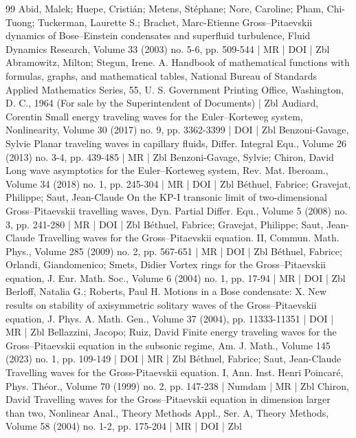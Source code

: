 \documentclass[10pt]{amsart}
\theoremstyle{definition}\newtheorem{defi}[theo]{Definition}\newtheorem{rema}[theo]{Remark}\newtheorem{exam}[theo]{Example}\newtheorem{exem}[theo]{Example}\newtheorem{nota}[theo]{Notation}
\begin{document}
\begin{thebibliography}{99}
Abid, Malek; Huepe, Cristián; Metens, Stéphane; Nore, Caroline; Pham, Chi-Tuong; Tuckerman, Laurette S.; Brachet, Marc-Etienne Gross–Pitaevskii dynamics of Bose–Einstein condensates and superfluid turbulence, Fluid Dynamics Research, Volume 33 (2003) no. 5-6, pp. 509-544 | MR | DOI | Zbl
Abramowitz, Milton; Stegun, Irene. A. Handbook of mathematical functions with formulas, graphs, and mathematical tables, National Bureau of Standards Applied Mathematics Series, 55, U. S. Government Printing Office, Washington, D. C., 1964 (For sale by the Superintendent of Documents) | Zbl
Audiard, Corentin Small energy traveling waves for the Euler–Korteweg system, Nonlinearity, Volume 30 (2017) no. 9, pp. 3362-3399 | DOI | Zbl
Benzoni-Gavage, Sylvie Planar traveling waves in capillary fluids, Differ. Integral Equ., Volume 26 (2013) no. 3-4, pp. 439-485 | MR | Zbl
Benzoni-Gavage, Sylvie; Chiron, David Long wave asymptotics for the Euler–Korteweg system, Rev. Mat. Iberoam., Volume 34 (2018) no. 1, pp. 245-304 | MR | DOI | Zbl
Béthuel, Fabrice; Gravejat, Philippe; Saut, Jean-Claude On the KP-I transonic limit of two-dimensional Gross–Pitaevskii travelling waves, Dyn. Partial Differ. Equ., Volume 5 (2008) no. 3, pp. 241-280 | MR | DOI | Zbl
Béthuel, Fabrice; Gravejat, Philippe; Saut, Jean-Claude Travelling waves for the Gross–Pitaevskii equation. II, Commun. Math. Phys., Volume 285 (2009) no. 2, pp. 567-651 | MR | DOI | Zbl
Béthuel, Fabrice; Orlandi, Giandomenico; Smets, Didier Vortex rings for the Gross–Pitaevskii equation, J. Eur. Math. Soc., Volume 6 (2004) no. 1, pp. 17-94 | MR | DOI | Zbl
Berloff, Natalia G.; Roberts, Paul H. Motions in a Bose condensate: X. New results on stability of axisymmetric solitary waves of the Gross–Pitaevskii equation, J. Phys. A. Math. Gen., Volume 37 (2004), pp. 11333-11351 | DOI | MR | Zbl
Bellazzini, Jacopo; Ruiz, David Finite energy traveling waves for the Gross–Pitaevskii equation in the subsonic regime, Am. J. Math., Volume 145 (2023) no. 1, pp. 109-149 | DOI | MR | Zbl
Béthuel, Fabrice; Saut, Jean-Claude Travelling waves for the Gross-Pitaevskii equation. I, Ann. Inst. Henri Poincaré, Phys. Théor., Volume 70 (1999) no. 2, pp. 147-238 | Numdam | MR | Zbl
Chiron, David Travelling waves for the Gross–Pitaevskii equation in dimension larger than two, Nonlinear Anal., Theory Methods Appl., Ser. A, Theory Methods, Volume 58 (2004) no. 1-2, pp. 175-204 | MR | DOI | Zbl

\end{thebibliography}
\end{document}
